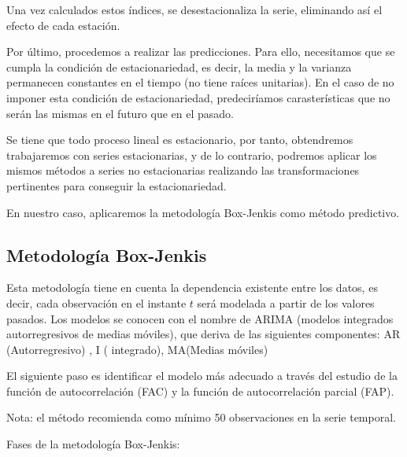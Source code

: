 \documentclass[12pt,a4paper,]{book}
\numberwithin{dummy}{section}
\theoremstyle{ocrenumbox}
\theoremstyle{blacknumex}
\theoremstyle{blacknumbox}
\theoremstyle{ocrenum}
\theoremstyle{ocrenum}
\begin{document}
Una vez calculados estos índices, se desestacionaliza la serie,
eliminando así el efecto de cada estación.

Por último, procedemos a realizar las predicciones. Para ello,
necesitamos que se cumpla la condición de estacionariedad, es decir, la
media y la varianza permanecen constantes en el tiempo (no tiene raíces
unitarias). En el caso de no imponer esta condición de estacionariedad,
predeciríamos carasterísticas que no serán las mismas en el futuro que
en el pasado.

Se tiene que todo proceso lineal es estacionario, por tanto, obtendremos
trabajaremos con series estacionarias, y de lo contrario, podremos
aplicar los mismos métodos a series no estacionarias realizando las
transformaciones pertinentes para conseguir la estacionariedad.

En nuestro caso, aplicaremos la metodología Box-Jenkis como método
predictivo.

\hypertarget{metodologuxeda-box-jenkis}{%
\subsection{Metodología Box-Jenkis}\label{metodologuxeda-box-jenkis}}

Esta metodología tiene en cuenta la dependencia existente entre los
datos, es decir, cada observación en el instante \(t\) será modelada a
partir de los valores pasados. Los modelos se conocen con el nombre de
ARIMA (modelos integrados autorregresivos de medias móviles), que deriva
de las siguientes componentes: AR (Autorregresivo) , I ( integrado),
MA(Medias móviles)

El siguiente paso es identificar el modelo más adecuado a través del
estudio de la función de autocorrelación (FAC) y la función de
autocorrelación parcial (FAP).

Nota: el método recomienda como mínimo 50 observaciones en la serie
temporal.

Fases de la metodología Box-Jenkis:
\end{document}
